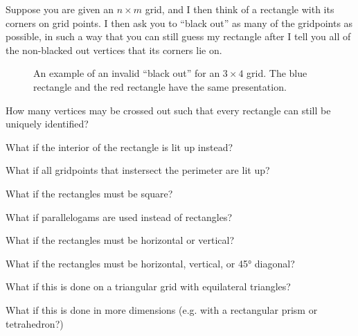 \documentclass{article}
\begin{document}
Suppose you are given an $n \times m$ grid, and I then think of a rectangle with
its corners on grid points.
I then ask you to ``black out'' as many of the gridpoints as possible,
in such a way that you can still guess my rectangle after I tell you all of the
non-blacked out vertices that its corners lie on.\\
\begin{figure}[!h]
  \centering
  \caption{
    An example of an invalid ``black out'' for an $3 \times 4$ grid.
    The blue rectangle and the red rectangle have the same presentation.
  }
\end{figure}

\begin{question}
  How many vertices may be crossed out such that every rectangle can still
    be uniquely identified?
\end{question}
\begin{related}
  \item What if the interior of the rectangle is lit up instead?
  \item What if all gridpoints that instersect the perimeter are lit up?
  \item What if the rectangles must be square?
  \item What if parallelogams are used instead of rectangles?
  \item What if the rectangles must be horizontal or vertical?
  \item What if the rectangles must be horizontal, vertical, or 45° diagonal?
  \item What if this is done on a triangular grid with equilateral triangles?
  \item What if this is done in more dimensions
    (e.g. with a rectangular prism or tetrahedron?)
\end{related}
\end{document}
